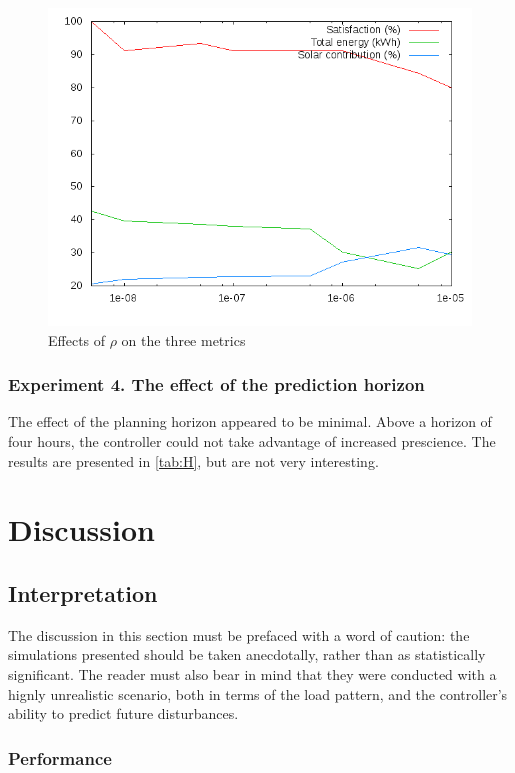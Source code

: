 \begin{figure}
   \centering
   \includegraphics[width=12cm]{images/rho-graphs}
   \caption{Effects of $\rho$ on the three metrics}
   \label{fig:rho-graphs}
\end{figure}

\subsubsection{Experiment 4. The effect of the prediction horizon}

The effect of the planning horizon appeared to be minimal.
Above a horizon of four hours, the controller could not take advantage of increased prescience.
The results are presented in \autoref{tab:H}, but are not very interesting.

\section{Discussion}

\subsection{Interpretation}

The discussion in this section must be prefaced with a word of caution: the simulations presented should be taken anecdotally, rather than as statistically significant.
The reader must also bear in mind that they were conducted with a hignly unrealistic scenario, both in terms of the load pattern, and the controller's ability to predict future disturbances.

\subsubsection{Performance}

